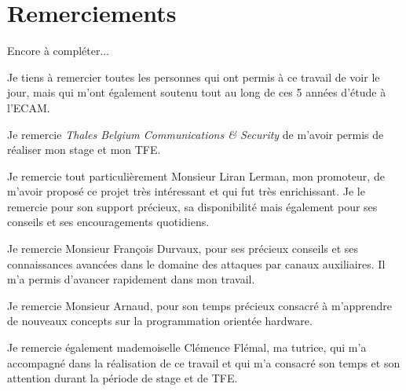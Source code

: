 \documentclass[oneside]{book}
\begin{document}
\newpage
\strut
\thispagestyle{empty}
\newpage



\chapter*{Remerciements}

Encore à compléter...

Je tiens à remercier toutes les personnes qui ont permis à ce travail de voir le jour, mais qui m’ont également soutenu tout au long de ces 5 années d’étude à l’ECAM.

Je remercie \textit{Thales Belgium Communications \& Security} de m’avoir permis de réaliser mon stage et mon TFE.

Je remercie tout particulièrement Monsieur Liran Lerman, mon promoteur, de m’avoir proposé ce projet très intéressant et qui fut très enrichissant. Je le remercie pour son support précieux, sa disponibilité mais également pour ses conseils et ses encouragements quotidiens.

Je remercie Monsieur François Durvaux, pour ses précieux conseils et ses connaissances avancées dans le domaine des attaques par canaux auxiliaires. Il m'a permis d'avancer rapidement dans mon travail.

Je remercie Monsieur Arnaud, pour son temps précieux consacré à m'apprendre de nouveaux concepts sur la programmation orientée hardware. 

Je remercie également mademoiselle Clémence Flémal, ma tutrice, qui m’a accompagné dans la réalisation de ce travail et qui m’a consacré son temps et son attention durant la période de stage et de TFE.

\newpage


{} %
\end{document}
